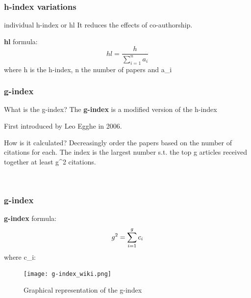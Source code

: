 \documentclass{beamer}
\begin{document}
\begin{frame}
    \frametitle{h-index variations}
    \begin{block}{individual h-index or hl}
        It reduces the effects of co-authorship.
    \end{block}
    \textbf{hl} formula:
    \[  hl = \frac{h}{\sum\limits_{i=1}^n a_i}\]
 where   \centering h is the h-index, n the number of papers and a_i 
\end{frame}
\begin{frame}
    \frametitle{g-index}
    \begin{block}{What is the g-index?}
        The \textbf{g-index} is a modified version of the h-index
    \end{block}
    \begin{alertblock}{}
        First introduced by Leo Egghe in 2006.
    \end{alertblock}
    \begin{block}{How is it calculated?}
        Decreasingly order the papers based on the number of citations for each. The index is the largest number s.t. the top g articles received together at least g^2 citations.\cite{g-index}
    \end{block}\\
\end{frame}
\begin{frame}
    \frametitle{g-index}
    \textbf{g-index} formula:
    \[
       \centering  g^2 = \sum\limits_{i=1}^g c_i
    \]
  where  \centering c_i: \\
    \begin{figure}[g]
        \texttt{[image: g-index\_wiki.png]}
        \caption{Graphical representation of the g-index}
    \end{figure}
\end{frame}
\end{document}
